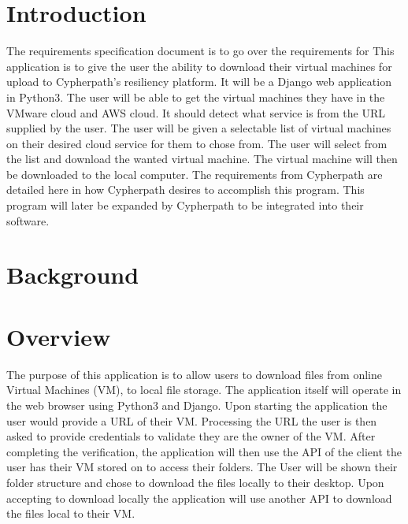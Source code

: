 \documentclass{article}
\title{}
\author{}
\date{}
\begin{document}
    

    \tableofcontents
    \listoffigures

    \newpage
    \begin{versionhistory}
    \end{versionhistory}
    \newpage

    \section{Introduction}
    The requirements specification document is to go over the requirements for %
    This application is to give the user the ability to download their virtual machines for upload to Cypherpath’s resiliency platform.
    It will be a Django web application in Python3. The user will be able to get the virtual machines they have in the VMware cloud and AWS cloud.
    It should detect what service is from the URL supplied by the user. The user will be given a selectable list of virtual machines on
    their desired cloud service for them to chose from. The user will select from the list and download the wanted virtual machine.
    The virtual machine will then be downloaded to the local computer. The requirements from Cypherpath are detailed here in how Cypherpath desires to
    accomplish this program. This program will later be expanded by Cypherpath to be integrated into their software.     
    

    \section{Background}


    \section{Overview}
    The purpose of this application is to allow users to download files from online Virtual Machines (VM), to local file storage.
    The application itself will operate in the web browser using Python3 and Django. Upon starting the application the user would
    provide a URL of their VM. Processing the URL the user is then asked to provide credentials to validate they are the owner of
    the VM. After completing the verification, the application will then use the API of the client the user has their VM stored on
    to access their folders. The User will be shown their folder structure and chose to download the files locally to their desktop.
    Upon accepting to download locally the application will use another API to download the files local to their VM.
\end{document}
